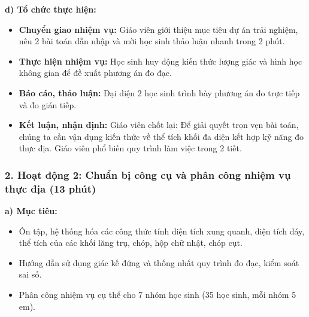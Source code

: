 \documentclass[12pt, a4paper]{article}
\begin{document}
\noindent \textbf{d) Tổ chức thực hiện:}
\begin{itemize}[leftmargin=0.6cm]
    \item \textbf{Chuyển giao nhiệm vụ:} Giáo viên giới thiệu mục tiêu dự án trải nghiệm, nêu 2 bài toán dẫn nhập và mời học sinh thảo luận nhanh trong 2 phút.
    \item \textbf{Thực hiện nhiệm vụ:} Học sinh huy động kiến thức lượng giác và hình học không gian để đề xuất phương án đo đạc.
    \item \textbf{Báo cáo, thảo luận:} Đại diện 2 học sinh trình bày phương án đo trực tiếp và đo gián tiếp.
    \item \textbf{Kết luận, nhận định:} Giáo viên chốt lại: Để giải quyết trọn vẹn bài toán, chúng ta cần vận dụng kiến thức về thể tích khối đa diện kết hợp kỹ năng đo thực địa. Giáo viên phổ biến quy trình làm việc trong 2 tiết.
\end{itemize}

\subsubsection*{2. Hoạt động 2: Chuẩn bị công cụ và phân công nhiệm vụ thực địa (13 phút)}

\noindent \textbf{a) Mục tiêu:}
\begin{itemize}[leftmargin=0.6cm]
    \item Ôn tập, hệ thống hóa các công thức tính diện tích xung quanh, diện tích đáy, thể tích của các khối lăng trụ, chóp, hộp chữ nhật, chóp cụt.
    \item Hướng dẫn sử dụng giác kế đứng và thống nhất quy trình đo đạc, kiểm soát sai số.
    \item Phân công nhiệm vụ cụ thể cho 7 nhóm học sinh (35 học sinh, mỗi nhóm 5 em).
\end{itemize}
\end{document}
